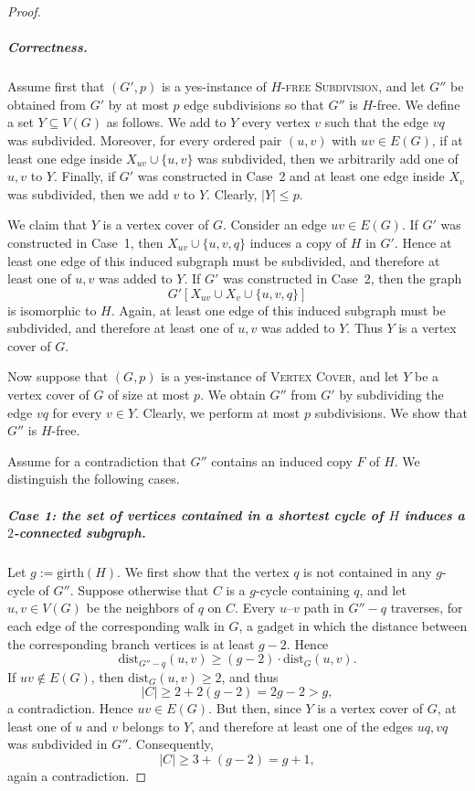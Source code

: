 \documentclass[a4paper,UKenglish,cleveref, autoref, thm-restate]{lipics-v2021}
\newcommand{\girth}{\mathrm{girth}}
\newcommand{\dist}{\mathrm{dist}}
\begin{document}
\begin{proof}
\subparagraph*{Correctness.}
Assume first that $(G',p)$ is a yes-instance of \textsc{$H$-free Subdivision}, and let $G''$ be obtained from $G'$ by at most $p$ edge subdivisions so that $G''$ is $H$-free.
We define a set $Y\subseteq V(G)$ as follows.
We add to $Y$ every vertex $v$ such that the edge $vq$ was subdivided.
Moreover, for every ordered pair $(u,v)$ with $uv\in E(G)$, if at least one edge inside $X_{uv}\cup \{u,v\}$ was subdivided, then we arbitrarily add one of $u,v$ to $Y$.
Finally, if $G'$ was constructed in Case~2 and at least one edge inside $X_v$ was subdivided, then we add $v$ to $Y$.
Clearly, $|Y|\leq p$.

We claim that $Y$ is a vertex cover of $G$.
Consider an edge $uv\in E(G)$.
If $G'$ was constructed in Case~1, then $X_{uv}\cup \{u,v,q\}$ induces a copy of $H$ in $G'$.
Hence at least one edge of this induced subgraph must be subdivided, and therefore at least one of $u,v$ was added to $Y$.
If $G'$ was constructed in Case~2, then the graph
\[
G'[X_{uv}\cup X_v\cup \{u,v,q\}]
\]
is isomorphic to $H$.
Again, at least one edge of this induced subgraph must be subdivided, and therefore at least one of $u,v$ was added to $Y$.
Thus $Y$ is a vertex cover of $G$.

Now suppose that $(G,p)$ is a yes-instance of \textsc{Vertex Cover}, and let $Y$ be a vertex cover of $G$ of size at most $p$.
We obtain $G''$ from $G'$ by subdividing the edge $vq$ for every $v\in Y$.
Clearly, we perform at most $p$ subdivisions.
We show that $G''$ is $H$-free.

Assume for a contradiction that $G''$ contains an induced copy $F$ of $H$.
We distinguish the following cases.

\subparagraph*{Case 1: the set of vertices contained in a shortest cycle of \boldmath $H$ induces a $2$-connected subgraph.}
Let $g:=\girth(H)$.
We first show that the vertex $q$ is not contained in any $g$-cycle of $G''$.
Suppose otherwise that $C$ is a $g$-cycle containing $q$, and let $u,v\in V(G)$ be the neighbors of $q$ on $C$.
Every $u$--$v$ path in $G''-q$ traverses, for each edge of the corresponding walk in $G$, a gadget in which the distance between the corresponding branch vertices is at least $g-2$.
Hence
\[
\dist_{G''-q}(u,v)\geq (g-2)\cdot \dist_G(u,v).
\]
If $uv\notin E(G)$, then $\dist_G(u,v)\geq 2$, and thus
\[
|C|\geq 2+2(g-2)=2g-2>g,
\]
a contradiction.
Hence $uv\in E(G)$.
But then, since $Y$ is a vertex cover of $G$, at least one of $u$ and $v$ belongs to $Y$, and therefore at least one of the edges $uq,vq$ was subdivided in $G''$.
Consequently,
\[
|C|\geq 3+(g-2)=g+1,
\]
again a contradiction.


\end{proof}
\end{document}
